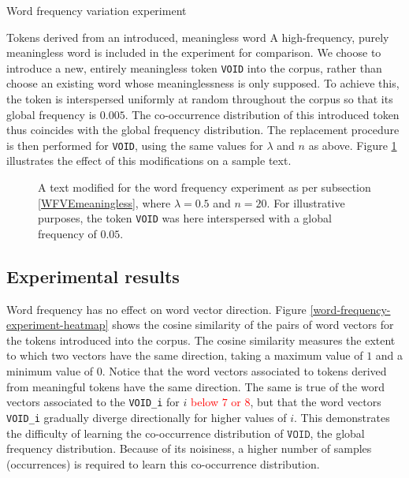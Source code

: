 \documentclass{article} %
\newcommand{\word}[1]{\texttt{#1}}
\begin{document}
\begin{section}{Word frequency variation experiment}
\begin{subsection}{Tokens derived from an introduced, meaningless word}\label{WFVEmeaningless}
	A high-frequency, purely meaningless word is included in the experiment for comparison.
	We choose to introduce a new, entirely meaningless token \word{VOID} into the corpus, rather than choose an existing word whose meaninglessness is only supposed.
	To achieve this, the token is interspersed uniformly at random throughout the corpus so that its global frequency is $0.005$.
	The co-occurrence distribution of this introduced token thus coincides with the global frequency distribution.
	The replacement procedure is then performed for \word{VOID}, using the same values for $\lambda$ and $n$ as above.
Figure \ref{fig:word-frequency-experiment-text-void} illustrates the effect of this modifications on a sample text.

\begin{figure}\label{fig:word-frequency-experiment-text-void}
	
	\caption{A text modified for the word frequency experiment as per subsection \ref{WFVEmeaningless}, where $\lambda=0.5$ and $n=20$. For illustrative purposes, the token \word{VOID} was here interspersed with a global frequency of $0.05$.}
\end{figure}
\end{subsection}

\subsection{Experimental results}
Word frequency has no effect on word vector direction.
Figure \ref{word-frequency-experiment-heatmap} shows the cosine similarity of the pairs of word vectors for the tokens introduced into the corpus.
The cosine similarity measures the extent to which two vectors have the same direction, taking a maximum value of $1$ and a minimum value of $0$.
Notice that the word vectors associated to tokens derived from meaningful tokens have the same direction.
The same is true of the word vectors associated to the \word{VOID\_i} for $i$ \textcolor{red}{below $7$ or $8$}, but that the word vectors \word{VOID\_i} gradually diverge directionally for higher values of $i$.
This demonstrates the difficulty of learning the co-occurrence distribution of $\word{VOID}$, the global frequency distribution.
Because of its noisiness, a higher number of samples (occurrences) is required to learn this co-occurrence distribution.


\end{section}
\end{document}
